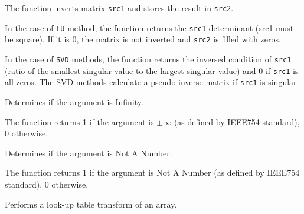\begin{description}
\end{description}

The function inverts matrix \texttt{src1} and stores the result in \texttt{src2}.

In the case of \texttt{LU} method, the function returns the \texttt{src1} determinant (src1 must be square). If it is 0, the matrix is not inverted and \texttt{src2} is filled with zeros.

In the case of \texttt{SVD} methods, the function returns the inversed condition of \texttt{src1} (ratio of the smallest singular value to the largest singular value) and 0 if \texttt{src1} is all zeros. The SVD methods calculate a pseudo-inverse matrix if \texttt{src1} is singular.


Determines if the argument is Infinity.


\begin{description}
\end{description}

The function returns 1 if the argument is $\pm \infty $ (as defined by IEEE754 standard), 0 otherwise.

Determines if the argument is Not A Number.


\begin{description}
\end{description}

The function returns 1 if the argument is Not A Number (as defined by IEEE754 standard), 0 otherwise.


Performs a look-up table transform of an array.


